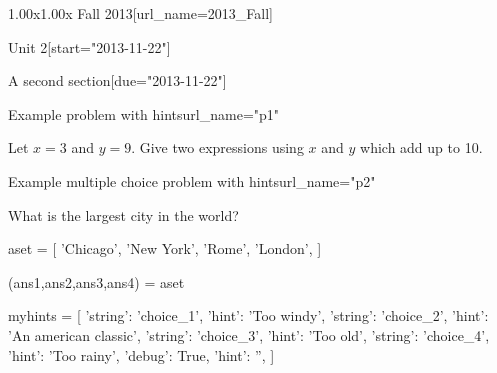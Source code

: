 \documentclass[12pt]{article}
\begin{document}
\begin{edXcourse}{1.00x}{1.00x Fall 2013}[url_name=2013_Fall]
\begin{edXchapter}{Unit 2}[start="2013-11-22"]
\begin{edXsection}{A second section}[due="2013-11-22"]
\begin{edXproblem}{Example problem with hints}{url_name="p1"}
 
Let $x=3$ and $y=9$.  Give two expressions using $x$ and $y$ which add
up to 10.



\end{edXproblem}


\begin{edXproblem}{Example multiple choice problem with hints}{url_name="p2"}
 
What is the largest city in the world?

\begin{edXscript}
aset = [ 'Chicago',
         'New York',
         'Rome',
         'London',
      ]

(ans1,ans2,ans3,ans4) = aset

myhints = [ {'string': 'choice_1', 'hint': 'Too windy'},
            {'string': 'choice_2', 'hint': 'An american classic'},
            {'string': 'choice_3', 'hint': 'Too old'},
            {'string': 'choice_4', 'hint': 'Too rainy'},
            {'debug': True, 'hint': ''},
          ]
  
\end{edXscript}


\end{edXproblem}


\end{edXsection}
\end{edXchapter}
\end{edXcourse}

\end{document}
